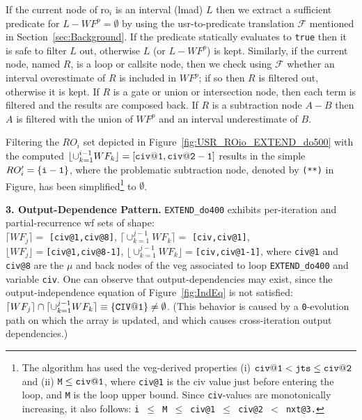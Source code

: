 \documentclass{sig-alternate}
\begin{document}
If the current node of {\sc ro}$_i$ is an interval ({\sc lmad}) $L$ then we extract a 
sufficient predicate for $L - WF^p = \emptyset$ by using the {\sc usr}-to-predicate
translation $\mathcal{F}$ mentioned in Section~\ref{sec:Background}.   
If the predicate statically evaluates to {\tt true} then it is safe to 
filter $L$ out, otherwise $L$ (or $L-WF^p$) is kept.  
%
Similarly, if the current node, named $R$, is a loop or callsite node, 
then we check using $\mathcal{F}$ whether an interval overestimate of 
$R$ is included in $WF^p$; if so then $R$ is filtered out, otherwise 
it is kept.  
%
If $R$ is a gate or union or intersection node,
then each term is filtered and the results are composed back. 
%
If $R$ is a subtraction node $A-B$ then $A$ is filtered with the union 
of $WF^p$ and an interval underestimate of $B$. 

Filtering the $RO_{i}$ set depicted in Figure~\ref{fig:USR_ROio_EXTEND_do500}
with the computed $\lfloor \cup_{k=1}^{i-1}WF_k\rfloor={\tt [civ@1,civ@2-1]}$
results in the simple $RO'_{i} = {\tt\{i-1\}}$, where the problematic 
subtraction node, denoted by {\tt (**)} in Figure, has been simplified\footnote{
The algorithm has used the {\sc veg}-derived properties (i) ${\tt civ@1} < {\tt jts} \leq {\tt civ@2}$ 
and (ii) ${\tt M} \leq {\tt civ@1}$, where {\tt civ@1} is the {\sc civ} value 
just before entering the loop, and {\tt M} is the loop upper bound. Since 
{\tt civ}-values are monotonically increasing, it also follows: 
{\tt i $\leq$ M $\leq$ civ@1 $\leq$ civ@2 $<$ nxt@3.}
}
to $\emptyset$.%


\vspace{1ex}

{\bf 3. Output-Dependence Pattern.} 
%
{\tt EXTEND\_do400} exhibits per-iteration and partial-recurrence {\sc wf} 
sets of shape:\\
\noindent$\lceil WF_{j}\rceil = $ {\tt[civ@1,civ@8]},
$\lceil\cup_{k=1}^{j-1}WF_{k} \rceil = $ {\tt[civ,civ@1]},\\
\noindent$\lfloor WF_j\rfloor = ${\tt[civ@1,civ@8-1]}, 
$\lfloor\cup_{k=1}^{j-1}WF_k\rfloor=${\tt[civ,civ@1-1]},
where {\tt civ@1} and {\tt civ@8} are the $\mu$ and back nodes of
the {\sc veg} associated to loop {\tt EXTEND\_do400} and variable {\tt civ}.
%
One can observe that output-dependencies may exist, since
the output-independence equation of Figure~\ref{fig:IndEq} is not satisfied:
$\lceil WF_{j}\rceil \cap \lceil \cup_{k=1}^{j-1}WF_{k} \rceil \equiv {\tt\{CIV@1\}}\ne\emptyset$.
(This behavior is caused by a {\tt 0}-evolution path on which the array is updated,
and which causes cross-iteration output dependencies.)
\end{document}
